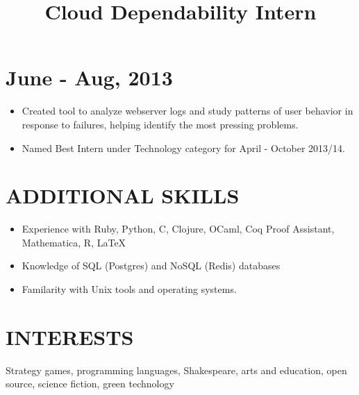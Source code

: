 \documentclass[centered, margin, 10pt]{res} %
\newcommand\mainsectionfont{\normalsize\bf\textup}
\renewcommand\sectionfont{\mainsectionfont} %
\renewcommand\dates{\section} %
\newenvironment{rlist}
    {\begin{minipage}[t]{\linewidth}\begin{itemize}\raggedright}
    {\end{itemize}\end{minipage}}
\newenvironment{positionlist}
    {\begin{position}\begin{rlist}}
    {\end{rlist}\end{position}}
\begin{document}
\begin{resume}
\title{Cloud Dependability Intern}
\dates{June - Aug, 2013}
\begin{positionlist}
  \item Created tool to analyze webserver logs and study patterns of user
    behavior in response to failures, helping identify the most pressing
    problems.
  \item Named Best Intern under Technology category for April - October 2013/14.
\end{positionlist}


\renewcommand\sectionfont{\mainsectionfont} %


\section{ADDITIONAL SKILLS}
\begin{rlist}
  \item Experience with Ruby, Python, C, Clojure, OCaml, Coq Proof Assistant,
    Mathematica, R, \LaTeX
  \item Knowledge of SQL (Postgres) and NoSQL (Redis) databases
  \item Familarity with Unix tools and operating systems.
\end{rlist}


\section{INTERESTS}
Strategy games, programming languages, Shakespeare, arts and education,
open source, science fiction, green technology


\end{resume}
\end{document}
